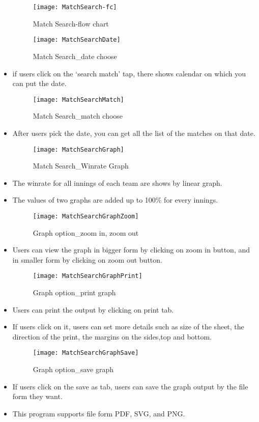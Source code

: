 \documentclass[conference,compsoc, twocolumn]{IEEEtran}
\begin{document}
\begin{itemize}
\begin{figure}[H]
\centering\texttt{[image: MatchSearch-fc]}
\caption{Match Search-flow chart}
\end{figure}

\begin{figure}[H]
\centering\texttt{[image: MatchSearchDate]}
\caption{Match Search\_date choose}
\end{figure}
\item if users click on the ‘search match’ tap, there shows calendar on which you can put the date.
\begin{figure}[H]
\centering\texttt{[image: MatchSearchMatch]}
\caption{Match Search\_match choose}
\end{figure} 
\item After users pick the date, you can get all the list of the matches on that date.

\begin{figure}[H]
\centering\texttt{[image: MatchSearchGraph]}
\caption{Match Search\_Winrate Graph}
\end{figure}
\item The winrate for all innings of each team are shows by linear graph.
\item The values of two graphs are added up to 100\% for every innings. 
\begin{figure}[H]
\centering\texttt{[image: MatchSearchGraphZoom]}
\caption{Graph option\_zoom in, zoom out}
\end{figure}
\item Users can view the graph in bigger form by clicking on zoom in button, and in smaller form by clicking on zoom out button.
\begin{figure}[H]
\centering\texttt{[image: MatchSearchGraphPrint]}
\caption{Graph option\_print graph}
\end{figure}
\item Users can print the output by clicking on print tab.
\item If users click on it, users can set more details such as size of the sheet, the direction of the print, the margins on the sides,top and bottom.
\begin{figure}[H]
\centering\texttt{[image: MatchSearchGraphSave]}
\caption{Graph option\_save graph}
\end{figure}
\item If users click on the save as tab, users can save the graph output by the file form they want.
\item This program supports file form PDF, SVG, and PNG.
\end{itemize}
\end{document}
